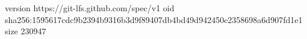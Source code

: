 version https://git-lfs.github.com/spec/v1
oid sha256:1595617cdc9b2394b9316b3d9f89407db4bd49d942450c2358698a6d907fd1e1
size 230947
